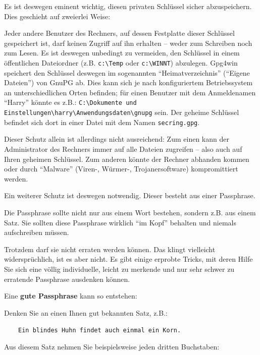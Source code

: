 \documentclass[a4paper,11pt, oneside,openright,titlepage,dvips]{scrbook}
\newcommand{\IncludeImage}[2][]{\texorhtml{%
\texttt{[image: \#2]}%
}{%
\htmlimg{#2.png}%
}}
\begin{document}
Es ist deswegen eminent wichtig, diesen privaten Schlüssel sicher
abzuspeichern. Dies geschieht auf zweierlei Weise:

\begin{center}
\IncludeImage[width=0.3\textwidth]{think-passphrase}
\end{center}

Jeder andere Benutzer des Rechners, auf dessen Festplatte dieser
Schlüssel gespeichert ist, darf keinen Zugriff auf ihn erhalten --
weder zum Schreiben noch zum Lesen.  Es ist deswegen unbedingt zu
vermeiden, den Schlüssel in einem öffentlichen Dateiordner
(z.B. \verb=c:\Temp= oder \verb=c:\WINNT=) abzulegen.  Gpg4win
speichert den Schlüssel deswegen im sogenannten "`Heimatverzeichnis"'
("`Eigene Dateien"') von GnuPG ab.
Dies kann sich je nach konfiguriertem Betriebssystem an unterschiedlichen Orten
befinden; für einen Benutzer mit
dem Anmeldenamen "`Harry"' könnte es z.B.:\newline
\verb=C:\Dokumente und Einstellungen\harry\Anwendungsdaten\gnupg= \newline
sein.  Der geheime Schlüssel befindet sich dort in einer Datei mit dem
Namen \verb=secring.gpg=.

Dieser Schutz allein ist allerdings nicht ausreichend: Zum einen kann
der Administrator des Rechners immer auf alle Dateien zugreifen --
also auch auf Ihren geheimen Schlüssel.  Zum anderen könnte der Rechner
abhanden kommen oder durch "`Malware"' (Viren-, Würmer-,
Trojanersoftware) kompromittiert werden. 

Ein weiterer Schutz ist deswegen notwendig.  Dieser besteht aus einer
Passphrase.

Die Passphrase sollte nicht nur aus einem Wort bestehen, sondern z.B.
aus einem Satz. Sie sollten diese Passphrase wirklich "`im Kopf"'
behalten und niemals aufschreiben müssen.

Trotzdem darf sie nicht erraten werden können. Das klingt vielleicht
widersprüchlich, ist es aber nicht. Es gibt einige erprobte Tricks,
mit deren Hilfe Sie sich eine völlig individuelle, leicht zu
merkende und nur sehr schwer zu erratende Passphrase ausdenken
können.


\clearpage
Eine \textbf{gute Passphrase} kann so entstehen:

Denken Sie an einen Ihnen gut bekannten Satz, z.B.: 

$\qquad$\verb-Ein blindes Huhn findet auch einmal ein Korn.-

Aus diesem Satz nehmen Sie beispielsweise jeden dritten Buchstaben:
\end{document}
